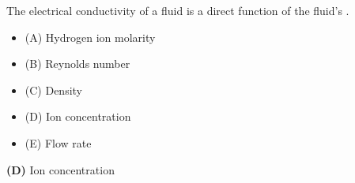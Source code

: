 

The electrical conductivity of a fluid is a direct function of the fluid's \underbar{\hskip 50pt}.

\begin{itemize}
\item{(A)} Hydrogen ion molarity
\vskip 5pt 
\item{(B)} Reynolds number
\vskip 5pt 
\item{(C)} Density
\vskip 5pt 
\item{(D)} Ion concentration
\vskip 5pt 
\item{(E)} Flow rate
\end{itemize}







{\bf (D)} Ion concentration
 









